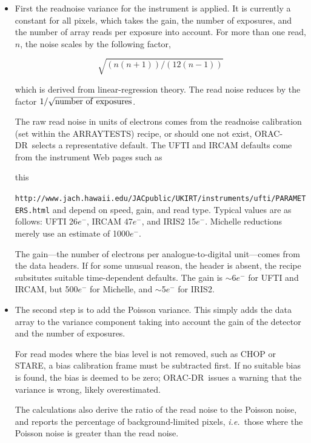\documentclass[twoside,11pt]{article}
\newcommand{\htmladdnormallink}[2]{#1}
\newcommand{\htmlref}[2]{#1}
\newenvironment{latexonly}{}{}
\renewcommand{\_}{\texttt{\symbol{95}}}
\newcommand{\ORACDR}{{\footnotesize ORAC-DR}}
\begin{document}
\begin{itemize}
\item
First the readnoise variance for the instrument is applied.  It is
currently a constant for all pixels, which takes the gain, the number
of exposures, and the number of array reads per exposure into account.
For more than one read, $n$, the noise scales by the following factor,

\[   \sqrt{(n(n+1))/(12(n-1))} \]

which is derived from linear-regression theory.
The read noise reduces by the factor $1/\sqrt{\rm{number~of~exposures}}$.

The raw read noise in units of electrons comes from the readnoise calibration
(set within the \htmlref{ARRAY\_TESTS}{ARRAY\_TESTS}) recipe, or
should one not exist, \ORACDR\ selects a representative default.
The UFTI and IRCAM defaults come from the instrument Web pages such as 
\begin{htmlonly}
\htmladdnormallink{this}{http://www.jach.hawaii.edu/JACpublic/UKIRT/instruments/ufti/PARAMETERS.html}
\end{htmlonly}
\begin{latexonly}
{\tt http://www.jach.hawaii.edu/JACpublic/UKIRT/instruments/ufti/PARAMETERS.html}
\end{latexonly}
and depend on speed, gain, and read type.  Typical values are as
follows: UFTI 26$e^{-}$, IRCAM 47$e^{-}$, and IRIS2 15$e^{-}$.  Michelle reductions
merely use an estimate of 1000$e^{-}$. 

The gain---the number of electrons per analogue-to-digital
unit---comes from the data headers.  If for some unusual reason, the
header is absent, the recipe subsitutes suitable time-dependent
defaults.  The gain is $\sim$6$e^{-}$ for UFTI and IRCAM, but
500$e^{-}$ for Michelle, and $\sim$5$e^{-}$ for IRIS2.

\item
The second step is to add the Poisson variance.  This simply adds the
data array to the variance component taking into account the gain of
the detector and the number of exposures. 

For read modes where the bias level is not removed, such as CHOP or
STARE, a bias \htmlref{calibration}{calibration_information} frame
must be subtracted first.  If no suitable bias is found, the bias is
deemed to be zero; \ORACDR\ issues a warning that the variance is
wrong, likely overestimated.

The calculations also derive the ratio of the read noise to the Poisson
noise, and reports the percentage of background-limited pixels, {\em
i.e.}\ those where the Poisson noise is greater than the read noise.
\end{itemize}
\end{document}
